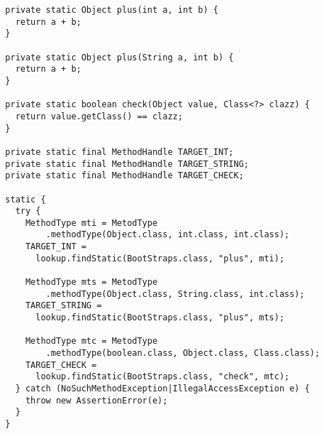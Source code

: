 {\scriptsize \begin{verbatim}
  private static Object plus(int a, int b) {
    return a + b;
  }

  private static Object plus(String a, int b) {
    return a + b;
  }

  private static boolean check(Object value, Class<?> clazz) {
    return value.getClass() == clazz;
  }

  private static final MethodHandle TARGET_INT;
  private static final MethodHandle TARGET_STRING;
  private static final MethodHandle TARGET_CHECK;

  static {
    try {
      MethodType mti = MetodType
          .methodType(Object.class, int.class, int.class);
      TARGET_INT =
        lookup.findStatic(BootStraps.class, "plus", mti);

      MethodType mts = MetodType
          .methodType(Object.class, String.class, int.class);
      TARGET_STRING =
        lookup.findStatic(BootStraps.class, "plus", mts);

      MethodType mtc = MetodType
          .methodType(boolean.class, Object.class, Class.class);
      TARGET_CHECK =
        lookup.findStatic(BootStraps.class, "check", mtc);
    } catch (NoSuchMethodException|IllegalAccessException e) {
      throw new AssertionError(e);
    }
  }
\end{verbatim} }
